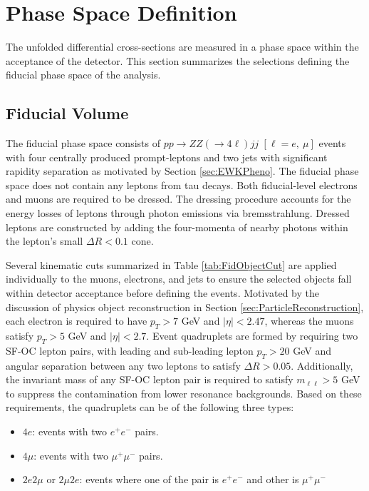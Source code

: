 \section{Phase Space Definition}
\label{sec:FidSel}

The unfolded differential cross-sections are measured in a phase space within the acceptance of the detector. This section summarizes the selections defining the fiducial phase space of the analysis.

\subsection{Fiducial Volume}
\label{subsec:FidVol} 

The fiducial phase space consists of $pp\rightarrow ZZ ( \rightarrow 4\ell) jj$ $[\ell = e,~\mu]$ events with four centrally produced prompt-leptons and two jets with significant rapidity separation as motivated by Section \ref{sec:EWKPheno}. The fiducial phase space does not contain any leptons from tau decays. Both fiducial-level electrons and muons are required to be dressed. The dressing procedure accounts for the energy losses of leptons through photon emissions via bremsstrahlung. Dressed leptons are constructed by adding the four-momenta of nearby photons within the lepton's small $\Delta R < 0.1$ cone. 

Several kinematic cuts summarized in Table \ref{tab:FidObjectCut} are applied individually to the muons, electrons, and jets to ensure the selected objects fall within detector acceptance before defining the events. Motivated by the discussion of physics object reconstruction in Section \ref{sec:ParticleReconstruction}, each electron is required to have $p_{T} > 7$ GeV and $|\eta| < 2.47$, whereas the muons satisfy $p_{T} > 5$ GeV and $|\eta| < 2.7$. Event quadruplets are formed by requiring two SF-OC lepton pairs, with leading and sub-leading lepton $p_{T}>20$ GeV and angular separation between any two leptons to satisfy $\Delta R > 0.05$. Additionally, the invariant mass of any SF-OC lepton pair is required to satisfy $m_{\ell \ell } > 5$ GeV to suppress the contamination from lower resonance backgrounds. Based on these requirements, the quadruplets can be of the following three types:

\begin{itemize}
\item{$4e$: events with two $e^{+}e^{-}$ pairs.}
\item{$4\mu$: events with two $\mu^{+}\mu^{-}$ pairs.}
\item{$2e2\mu$ or $2\mu2e$: events where one of the pair is $e^{+}e^{-}$ and other is $\mu^{+}\mu^{-}$}
\end{itemize}

